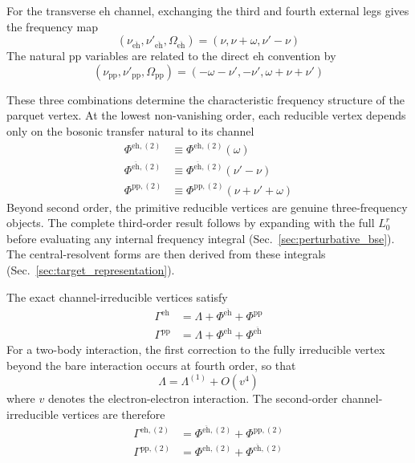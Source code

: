 \documentclass[aip,jcp,reprint,noshowkeys,superscriptaddress]{revtex4-1}
\newcommand{\eh}{\text{eh}}
\newcommand{\teh}{\overline{\text{eh}}}
\newcommand{\pp}{\text{pp}}
\begin{document}
For the transverse $\eh$ channel, exchanging the third and fourth external
legs gives the frequency map
\begin{equation}
	\left(
	\nu_{\teh},
	\nu'_{\teh},
	\Omega_{\teh}
	\right)
	=
	\left(
	\nu,
	\nu+\omega,
	\nu'-\nu
	\right)
	\label{eq:crossed_frequency_map}
\end{equation}
The natural $\pp$ variables are related to the direct $\eh$ convention by
\begin{equation}
	\left(
	\nu_\pp,
	\nu'_\pp,
	\Omega_\pp
	\right)
	=
	\left(
	-\omega-\nu',
	-\nu',
	\omega+\nu+\nu'
	\right)
	\label{eq:pp_frequency_map}
\end{equation}

These three combinations determine the characteristic frequency structure of
the parquet vertex.
At the lowest non-vanishing order, each reducible vertex depends only on the
bosonic transfer natural to its channel
\begin{align}
	\Phi^{\eh,(2)}
	&\equiv
	\Phi^{\eh,(2)}(\omega)
	\\
	\Phi^{\teh,(2)}
	&\equiv
	\Phi^{\teh,(2)}(\nu'-\nu)
	\\
	\Phi^{\pp,(2)}
	&\equiv
	\Phi^{\pp,(2)}(\nu+\nu'+\omega)
	\label{eq:Phi_frequency_second_order}
\end{align}
Beyond second order, the primitive reducible vertices are genuine
three-frequency objects.
The complete third-order result follows by expanding with the full $L_0^r$
before evaluating any internal frequency integral
(Sec.~\ref{sec:perturbative_bse}). The central-resolvent forms are then
derived from these integrals (Sec.~\ref{sec:target_representation}).

The exact channel-irreducible vertices satisfy
\begin{align}
	\Gamma^\eh
	&=
	\Lambda
	+
	\Phi^{\teh}
	+
	\Phi^\pp
	\label{eq:Gamma_eh}
	\\
	\Gamma^\pp
	&=
	\Lambda
	+
	\Phi^\eh
	+
	\Phi^{\teh}
	\label{eq:Gamma_pp}
\end{align}
For a two-body interaction, the first correction to the fully irreducible
vertex beyond the bare interaction occurs at fourth order, so that
\begin{equation}
	\Lambda
	=
	\Lambda^{(1)}
	+
	O(v^4)
	\label{eq:Lambda_order}
\end{equation}
where $v$ denotes the electron-electron interaction.
The second-order channel-irreducible vertices are therefore
\begin{align}
	\Gamma^{\eh,(2)}
	&=
	\Phi^{\teh,(2)}
	+
	\Phi^{\pp,(2)}
	\label{eq:Gamma_eh_second}
	\\
	\Gamma^{\pp,(2)}
	&=
	\Phi^{\eh,(2)}
	+
	\Phi^{\teh,(2)}
	\label{eq:Gamma_pp_second}
\end{align}
\end{document}
